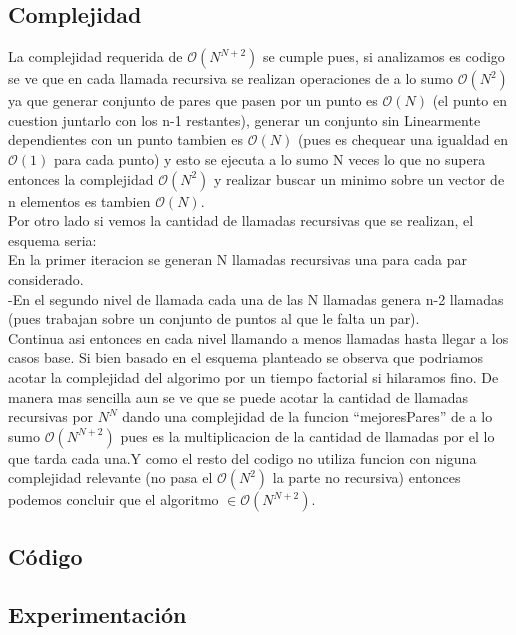     \subsection{Complejidad}

    	La complejidad requerida de $\mathcal{O}(N^{N+2})$ se cumple pues, si analizamos es codigo se ve que en cada llamada recursiva se realizan operaciones de a lo sumo $\mathcal{O}(N^{2})$ ya que generar conjunto de pares que pasen por un punto es $\mathcal{O}(N)$ (el punto en cuestion juntarlo con los n-1 restantes), generar un conjunto sin Linearmente dependientes con un punto tambien es $\mathcal{O}(N)$ (pues es chequear una igualdad en  $\mathcal{O}(1)$ para cada punto) y esto se ejecuta a lo sumo N veces lo que no supera entonces la complejidad $\mathcal{O}(N^{2})$ y realizar buscar un minimo sobre un vector de n elementos es tambien $\mathcal{O}(N)$. \\
		Por otro lado si vemos la cantidad de llamadas recursivas que se realizan, el esquema seria:\\
		En la primer iteracion se generan N llamadas recursivas una para cada par considerado.\\
		-En el segundo nivel de llamada cada una de las N llamadas genera n-2 llamadas (pues trabajan sobre un conjunto de puntos al que le falta un par). \\ 
		Continua asi entonces en cada nivel llamando a menos llamadas hasta llegar a los casos base.
		Si bien basado en el esquema planteado se observa que podriamos acotar la complejidad del algorimo por un tiempo factorial si hilaramos fino. De manera mas sencilla aun se ve que se puede acotar la cantidad de llamadas recursivas por $N^{N}$ dando una complejidad de la funcion ``mejoresPares'' de a lo sumo $\mathcal{O}(N^{N+2})$ pues es la multiplicacion de la cantidad de llamadas por el lo que tarda cada una.Y como el resto del codigo no utiliza funcion con niguna complejidad relevante (no pasa el $\mathcal{O}(N^{2})$ la parte no recursiva) entonces podemos concluir que el algoritmo $ \in \mathcal{O}(N^{N+2})$.


    \subsection{Código}


    \subsection{Experimentación}

